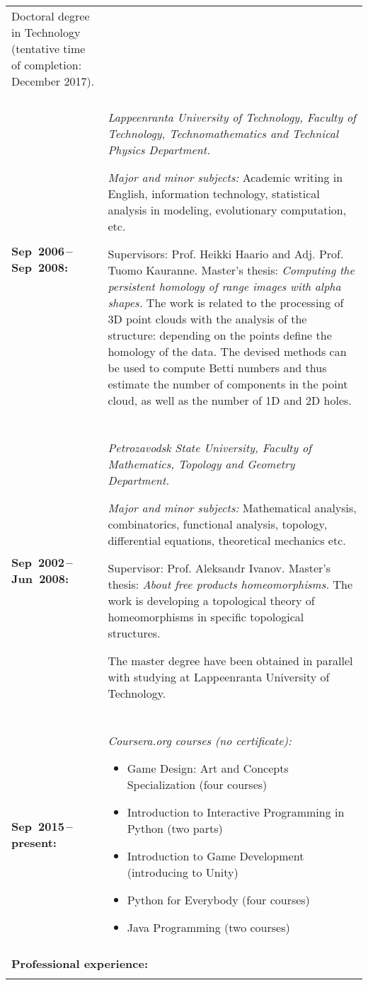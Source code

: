 \documentclass[a4paper]{article}
\begin{document}
\begin{longtable}{p{} p{}}
  Doctoral degree in Technology (tentative time of completion: December 2017).
\\
&\\
\textbf{Sep~2006\,--\,Sep~2008:} &
  \textmd{\textsl{Lappeenranta University of Technology, Faculty of Technology,
    Technomathematics and Technical Physics Department.}}

  \textit{Major and minor subjects:} Academic writing in English, information
  technology, statistical analysis in modeling, evolutionary computation, etc.

  Supervisors: Prof. Heikki Haario and Adj. Prof. Tuomo Kauranne.
  Master's thesis: \emph{Computing the persistent homology of range images with
  alpha shapes.} The work is related to the processing of 3D point clouds with
  the analysis of the structure: depending on the points define the homology of
  the data. The devised methods can be used to compute Betti numbers and thus
  estimate the number of components in the point cloud, as well as the number
  of 1D and 2D holes.\\

&\\
\textbf{Sep~2002\,--\,Jun~2008:} &
  \textmd{\textsl{Petrozavodsk State University, Faculty of Mathematics,
    Topology and Geometry Department.}}

  \textit{Major and minor subjects:} Mathematical analysis, combinatorics,
  functional analysis, topology, differential equations, theoretical mechanics
  etc.

  Supervisor: Prof. Aleksandr Ivanov.
  Master's thesis: \emph{About free products homeomorphisms.} The work is
  developing a topological theory of homeomorphisms in specific topological
  structures.

  The master degree have been obtained in parallel with studying at Lappeenranta
  University of Technology.

\\

& \\
\textbf{Sep~2015\,--\,present:} &
\textmd{\textsl{Coursera.org courses (no certificate):}}

  \vspace{-10pt}
  \begin{itemize}
    \setlength\itemsep{-3pt}
    \item Game Design: Art and Concepts Specialization (four courses)
    \item Introduction to Interactive Programming in Python (two parts)
    \item Introduction to Game Development (introducing to Unity)
    \item Python for Everybody (four courses)
    \item Java Programming (two courses)
  \end{itemize}
\\
& \\
\multicolumn{2}{l}{\cellcolor{myGray}\textbf{Professional experience:}}\\
& \\


\end{longtable}
\end{document}
